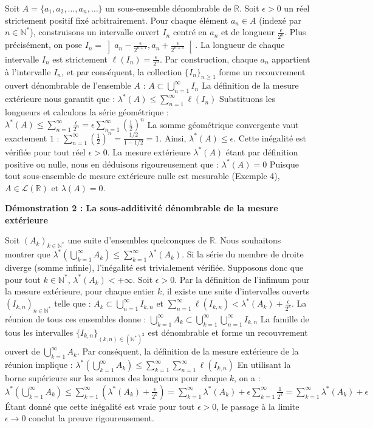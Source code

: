 \documentclass[11pt,a4paper]{article}
\begin{document}
Soit $A = \{a_1, a_2, \dots, a_n, \dots \}$ un sous-ensemble dénombrable de $\mathbb{R}$.
Soit $\epsilon > 0$ un réel strictement positif fixé arbitrairement.
Pour chaque élément $a_n \in A$ (indexé par $n \in \mathbb{N}^*$), construisons un intervalle ouvert $I_n$ centré en $a_n$ et de longueur $\frac{\epsilon}{2^n}$.
Plus précisément, on pose $I_n = \left] a_n - \frac{\epsilon}{2^{n+1}}, a_n + \frac{\epsilon}{2^{n+1}} \right[$.
La longueur de chaque intervalle $I_n$ est strictement $\ell(I_n) = \frac{\epsilon}{2^n}$.
Par construction, chaque $a_n$ appartient à l'intervalle $I_n$, et par conséquent, la collection $\{I_n\}_{n \ge 1}$ forme un recouvrement ouvert dénombrable de l'ensemble $A$ :
$A \subset \bigcup_{n=1}^\infty I_n$
La définition de la mesure extérieure nous garantit que :
$\lambda^*(A) \le \sum_{n=1}^\infty \ell(I_n)$
Substituons les longueurs et calculons la série géométrique :
$\lambda^*(A) \le \sum_{n=1}^\infty \frac{\epsilon}{2^n} = \epsilon \sum_{n=1}^\infty \left(\frac{1}{2}\right)^n$
La somme géométrique convergente vaut exactement $1$ : $\sum_{n=1}^\infty \left(\frac{1}{2}\right)^n = \frac{1/2}{1 - 1/2} = 1$.
Ainsi, $\lambda^*(A) \le \epsilon$.
Cette inégalité est vérifiée pour tout réel $\epsilon > 0$. La mesure extérieure $\lambda^*(A)$ étant par définition positive ou nulle, nous en déduisons rigoureusement que :
$\lambda^*(A) = 0$
Puisque tout sous-ensemble de mesure extérieure nulle est mesurable (Exemple 4), $A \in \mathcal{L}(\mathbb{R})$ et $\lambda(A) = 0$.

\textbf{Démonstration 2 : La sous-additivité dénombrable de la mesure extérieure}

Soit $(A_k)_{k \in \mathbb{N}^*}$ une suite d'ensembles quelconques de $\mathbb{R}$. Nous souhaitons montrer que $\lambda^*\left( \bigcup_{k=1}^\infty A_k \right) \le \sum_{k=1}^\infty \lambda^*(A_k)$.
Si la série du membre de droite diverge (somme infinie), l'inégalité est trivialement vérifiée. Supposons donc que pour tout $k \in \mathbb{N}^*$, $\lambda^*(A_k) < +\infty$.
Soit $\epsilon > 0$. Par la définition de l'infimum pour la mesure extérieure, pour chaque entier $k$, il existe une suite d'intervalles ouverts $(I_{k, n})_{n \in \mathbb{N}^*}$ telle que :
$A_k \subset \bigcup_{n=1}^\infty I_{k, n}$ et $\sum_{n=1}^\infty \ell(I_{k, n}) < \lambda^*(A_k) + \frac{\epsilon}{2^k}$.
La réunion de tous ces ensembles donne :
$\bigcup_{k=1}^\infty A_k \subset \bigcup_{k=1}^\infty \bigcup_{n=1}^\infty I_{k, n}$
La famille de tous les intervalles $\{I_{k, n}\}_{(k, n) \in (\mathbb{N}^*)^2}$ est dénombrable et forme un recouvrement ouvert de $\bigcup_{k=1}^\infty A_k$.
Par conséquent, la définition de la mesure extérieure de la réunion implique :
$\lambda^*\left( \bigcup_{k=1}^\infty A_k \right) \le \sum_{k=1}^\infty \sum_{n=1}^\infty \ell(I_{k, n})$
En utilisant la borne supérieure sur les sommes des longueurs pour chaque $k$, on a :
$\lambda^*\left( \bigcup_{k=1}^\infty A_k \right) \le \sum_{k=1}^\infty \left( \lambda^*(A_k) + \frac{\epsilon}{2^k} \right) = \sum_{k=1}^\infty \lambda^*(A_k) + \epsilon \sum_{k=1}^\infty \frac{1}{2^k} = \sum_{k=1}^\infty \lambda^*(A_k) + \epsilon$
Étant donné que cette inégalité est vraie pour tout $\epsilon > 0$, le passage à la limite $\epsilon \to 0$ conclut la preuve rigoureusement.
\end{document}
